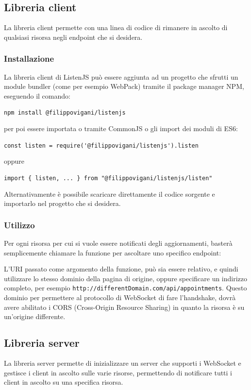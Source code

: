 \documentclass[12pt,a4paper,openright]{report}
\begin{document}
\subsection{Libreria client}
La libreria client permette con una linea di codice di rimanere in ascolto di qualsiasi risorsa negli endpoint che si desidera.

\subsubsection{Installazione}
La libreria client di ListenJS può essere aggiunta ad un progetto che sfrutti un module bundler (come per esempio WebPack) tramite il package manager NPM, eseguendo il comando:
\begin{center}
\lstinline{npm install @filippovigani/listenjs}
\end{center}
per poi essere importata o tramite CommonJS o gli import dei moduli di ES6:
\begin{center}
\lstinline{const listen = require('@filippovigani/listenjs').listen}
\end{center}
oppure
\begin{center}
\lstinline|import { listen, ... } from "@filippovigani/listenjs/listen"|
\end{center}  
Alternativamente è possibile scaricare direttamente il codice sorgente\cite{listenjs_repo} e importarlo nel progetto che si desidera.

\subsubsection{Utilizzo}
Per ogni risorsa per cui si vuole essere notificati degli aggiornamenti, basterà semplicemente chiamare la funzione per ascoltare uno specifico endpoint:

L'URI passato come argomento della funzione, può sia essere relativo, e quindi utilizzare lo stesso dominio della pagina di origine, oppure specificare un indirizzo completo, per esempio \lstinline{http://differentDomain.com/api/appointments}. Questo dominio per permettere al protocollo di WebSocket di fare l'handshake, dovrà avere abilitato i CORS (Cross-Origin Resource Sharing) in quanto la risorsa è su un'origine differente.

\subsection{Libreria server}
La libreria server permette di inizializzare un server che supporti i WebSocket e gestisce i client in ascolto sulle varie risorse, permettendo di notificare tutti i client in ascolto su una specifica risorsa. 
\end{document}
